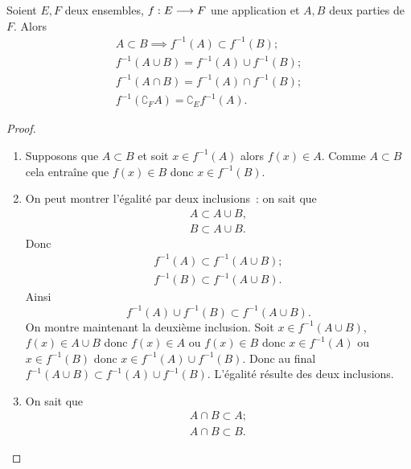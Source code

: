 \begin{prop}
    Soient \(E,F\) deux ensembles, \(f:E \longrightarrow F\) une application et 
    \(A,B\) deux parties de \(F\). Alors
    \begin{gather}
        A \subset B \implies f^{-1}(A) \subset f^{-1}(B);\\
        f^{-1}(A \cup B) = f^{-1}(A) \cup f^{-1}(B);\\
        f^{-1}(A \cap B) = f^{-1}(A) \cap f^{-1}(B);\\
        f^{-1}(\complement_F A) = \complement_E f^{-1}(A).
    \end{gather}
\end{prop}
\begin{proof}
    \begin{enumerate}
        \item Supposons que \(A \subset B\) et soit \(x \in f^{-1}(A)\) alors 
            \(f(x) \in A\). Comme \(A\subset B\) cela entraîne que \(f(x) \in 
            B\) donc \(x \in f^{-1}(B)\).
        \item On peut montrer l'égalité par deux inclusions~: on sait que
            \begin{gather}
                A \subset A \cup B, \\
                B \subset A \cup B.
            \end{gather}
            Donc
            \begin{gather} 
                f^{-1}(A) \subset f^{-1}(A \cup B); \\
                f^{-1}(B) \subset f^{-1}(A \cup B).
            \end{gather}
            Ainsi 
            \begin{equation}
                f^{-1}(A) \cup f^{-1}(B) \subset f^{-1}(A \cup B).
            \end{equation}
            On montre maintenant la deuxième inclusion. Soit \(x \in f^{-1}(A 
            \cup B)\), \(f(x) \in A \cup B\) donc \(f(x) \in A\) ou \(f(x) \in 
            B\) donc \(x \in f^{-1}(A)\) ou \(x \in f^{-1}(B)\) donc \(x \in 
            f^{-1}(A) \cup f^{-1}(B)\). Donc au final \(f^{-1}(A \cup B) \subset 
            f^{-1}(A) \cup f^{-1}(B)\). L'égalité résulte des deux inclusions.
        \item On sait que
            \begin{gather}
                A \cap B \subset A ; \\ A \cap B \subset B.
            \end{gather}

\end{enumerate}
\end{proof}
